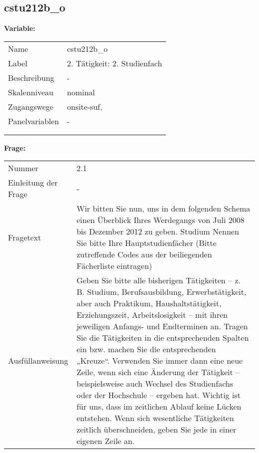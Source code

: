 	
	
	\subsection{cstu212b\_o}
	\label{subSection:cstu212b_o}

	\noindent\textbf{Variable:}\\
		\begin{tabular}{lL{11.3cm}}
			\label{tableVariable:cstu212b_o}
			Name & cstu212b\_o \\
			Label & 2. Tätigkeit: 2. Studienfach \\
			Beschreibung & - \\
			Skalenniveau & nominal \\
			Zugangswege &
				onsite-suf,
 \\
			Panelvariablen & -
			 \\
			 \\
 \\
		\end{tabular}

		\vspace*{1 cm}
		\noindent\textbf{Frage:}\\
		\begin{tabular}{lL{11.3cm}}
			\label{tableQuestion:cstu212b_o}
			Nummer & 2.1 \\
			Einleitung der Frage & - \\
			Fragetext & Wir bitten Sie nun, uns in dem folgenden Schema einen Überblick Ihres Werdegangs von Juli 2008 bis Dezember 2012 zu geben.
Studium
Nennen Sie bitte Ihre Hauptstudienfächer
(Bitte zutreffende Codes aus der beiliegenden Fächerliste eintragen) \\
			Ausfüllanweisung & Geben Sie bitte alle bisherigen Tätigkeiten – z. B. Studium, Berufsausbildung, Erwerbstätigkeit, aber auch Praktikum, Haushaltstätigkeit,
Erziehungszeit, Arbeitslosigkeit – mit ihren jeweiligen Anfangs- und Endterminen an. Tragen Sie die Tätigkeiten in die entsprechenden Spalten ein bzw. machen Sie die entsprechenden „Kreuze“. Verwenden Sie immer dann eine neue Zeile, wenn sich eine Änderung der Tätigkeit – beispielsweise auch Wechsel des Studienfachs oder der Hochschule – ergeben hat. Wichtig ist für uns, dass im zeitlichen Ablauf keine Lücken entstehen. Wenn sich wesentliche Tätigkeiten zeitlich überschneiden, geben Sie jede in einer eigenen Zeile an. \\
		\end{tabular}





